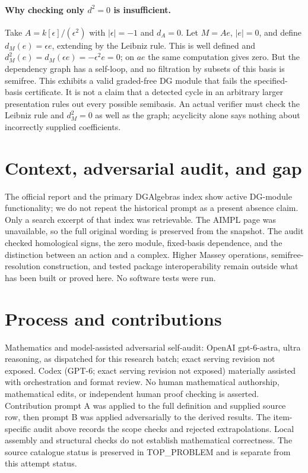 \documentclass[11pt]{article}
\begin{document}
\paragraph{Why checking only $d^2=0$ is insufficient.}
Take $A=k[\epsilon]/(\epsilon^2)$ with $|\epsilon|=-1$ and $d_A=0$.
Let $M=Ae$, $|e|=0$, and define $d_M(e)=\epsilon e$, extending by the
Leibniz rule. This is well defined and $d_M^2(e)=d_M(\epsilon e)
=-\epsilon^2e=0$; on $a e$ the same computation gives zero. But the
dependency graph has a self-loop, and no filtration by subsets of this basis
is semifree. This exhibits a valid graded-free DG module that fails the
specified-basis certificate. It is not a claim that a detected cycle in an
arbitrary larger presentation rules out every possible semibasis.
An actual verifier must check the Leibniz rule and $d_M^2=0$ as well as the
graph; acyclicity alone says nothing about incorrectly supplied coefficients.

\section{Context, adversarial audit, and gap}
The official report and the primary DGAlgebras index show active DG-module
functionality; we do not repeat the historical prompt as a present absence
claim. Only a search excerpt of that index was retrievable. The AIMPL page
was unavailable, so the full original wording is preserved from the snapshot.
The audit checked homological signs, the zero module, fixed-basis dependence,
and the distinction between an action and a complex. Higher Massey operations,
semifree-resolution construction, and tested package interoperability remain
outside what has been built or proved here. No software tests were run.

\section{Process and contributions}
Mathematics and model-assisted adversarial self-audit: OpenAI gpt-6-astra, ultra reasoning, as dispatched for this research batch; exact serving revision not exposed. Codex (GPT-6; exact serving revision not exposed) materially assisted with orchestration and format review. No human mathematical authorship, mathematical edits, or independent human proof checking is asserted.
Contribution prompt A was applied to the full definition and supplied source row, then prompt B was applied adversarially to the derived results. The item-specific audit above records the scope checks and rejected extrapolations. Local assembly and structural checks do not establish mathematical correctness. The source catalogue status is preserved in TOP\_PROBLEM and is separate from this attempt status.
\end{document}

